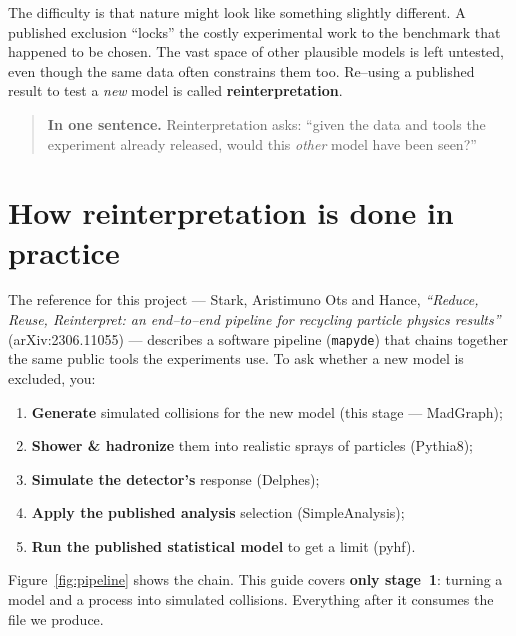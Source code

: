 \documentclass[11pt,oneside]{report}
\begin{document}
The difficulty is that nature might look like something slightly different. A published exclusion
``locks'' the costly experimental work to the benchmark that happened to be chosen. The vast space
of other plausible models is left untested, even though the same data often constrains them too.
Re--using a published result to test a \emph{new} model is called \textbf{reinterpretation}.

\begin{quote}\textbf{In one sentence.} Reinterpretation asks: ``given the data and tools the
experiment already released, would this \emph{other} model have been seen?''\end{quote}

\section{How reinterpretation is done in practice}
The reference for this project --- Stark, Aristimuno Ots and Hance,
\emph{``Reduce, Reuse, Reinterpret: an end--to--end pipeline for recycling particle physics
results''} (arXiv:2306.11055) --- describes a software pipeline (\texttt{mapyde}) that chains
together the same public tools the experiments use. To ask whether a new model is excluded, you:
\begin{enumerate}[nosep]
  \item \textbf{Generate} simulated collisions for the new model (this stage --- MadGraph);
  \item \textbf{Shower \& hadronize} them into realistic sprays of particles (Pythia8);
  \item \textbf{Simulate the detector's} response (Delphes);
  \item \textbf{Apply the published analysis} selection (SimpleAnalysis);
  \item \textbf{Run the published statistical model} to get a limit (pyhf).
\end{enumerate}
Figure~\ref{fig:pipeline} shows the chain. This guide covers \textbf{only stage~1}: turning a
model and a process into simulated collisions. Everything after it consumes the file we produce.
\end{document}
